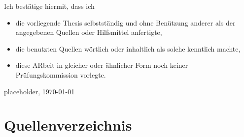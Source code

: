 \documentclass[a4paper,12pt]{article}
\begin{document}
    Ich bestätige hiermit, dass ich
    \begin{itemize}
        \item die vorliegende Thesis selbstständig und ohne Benützung anderer als der angegebenen Quellen oder Hilfsmittel anfertigte,
        \item die benutzten Quellen wörtlich oder inhaltlich als solche kenntlich machte,
        \item diese ARbeit in gleicher oder ähnlicher Form noch keiner Prüfungskommission vorlegte.
    \end{itemize}
    placeholder, \today\newline

    \section{Quellenverzeichnis}

    \printbibliography
\end{document}
